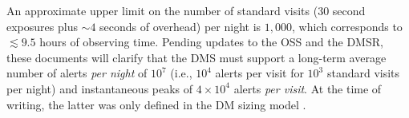 \documentclass[DM,authoryear,toc]{lsstdoc}
\begin{document}

An approximate upper limit on the number of standard visits ($30$ second exposures plus $\sim4$ seconds of overhead) per night is $1,000$, which corresponds to $\lesssim9.5$ hours of observing time. Pending updates to the OSS and the DMSR, these documents will clarify that the DMS must support a long-term average number of alerts {\it per night} of $10^7$ (i.e., $10^4$ alerts per visit for $10^3$ standard visits per night) and instantaneous peaks of $4\times10^4$ alerts {\it per visit}. At the time of writing, the latter was only defined in the DM sizing model .

\end{document}
